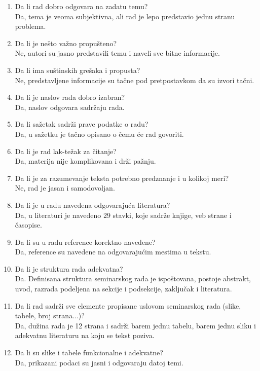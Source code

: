 \documentclass[a4paper]{report}
\begin{document}
\begin{enumerate}
\item Da li rad dobro odgovara na zadatu temu?\\
Da, tema je veoma subjektivna, ali rad je lepo predstavio jednu stranu problema.
\item Da li je nešto važno propušteno?\\
Ne, autori su jasno predstavili temu i naveli sve bitne informacije.
\item Da li ima suštinskih grešaka i propusta?\\
Ne, predstavljene informacije su tačne pod pretpostavkom da su izvori tačni.
\item Da li je naslov rada dobro izabran?\\
Da, naslov odgovara sadržaju rada.
\item Da li sažetak sadrži prave podatke o radu?\\
Da, u sažetku je tačno opisano o čemu će rad govoriti.
\item Da li je rad lak-težak za čitanje?\\
Da, materija nije komplikovana i drži pažnju.
\item Da li je za razumevanje teksta potrebno predznanje i u kolikoj meri?\\
Ne, rad je jasan i samodovoljan.
\item Da li je u radu navedena odgovarajuća literatura?\\
Da, u literaturi je navedeno 29 stavki, koje sadrže knjige, veb strane i časopise.
\item Da li su u radu reference korektno navedene?\\
Da, reference su navedene na odgovarajućim mestima u tekstu.
\item Da li je struktura rada adekvatna?\\
Da. Definisana struktura seminarskog rada je ispoštovana, postoje abstrakt, uvod, razrada podeljena na sekcije i podsekcije, zaključak i literatura.
\item Da li rad sadrži sve elemente propisane uslovom seminarskog rada (slike, tabele, broj strana...)?\\
Da, dužina rada je 12 strana i sadrži barem jednu tabelu, barem jednu sliku i adekvatnu literaturu na koju se tekst poziva.
\item Da li su slike i tabele funkcionalne i adekvatne?\\
Da, prikazani podaci su jasni i odgovaraju datoj temi.
\end{enumerate}
\end{document}
